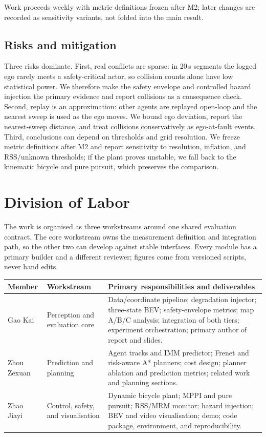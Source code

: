 \documentclass[10pt,a4paper]{article}
\renewcommand{\arraystretch}{1.0}
\begin{document}
Work proceeds weekly with metric definitions frozen after M2; later changes are recorded as sensitivity variants, not folded into the main result.

\newpage
\subsection{Risks and mitigation}

Three risks dominate. First, real conflicts are sparse: in 20\,s segments the logged ego rarely meets a safety-critical actor, so collision counts alone have low statistical power. We therefore make the safety envelope and controlled hazard injection the primary evidence and report collisions as a consequence check. Second, replay is an approximation: other agents are replayed open-loop and the nearest sweep is used as the ego moves. We bound ego deviation, report the nearest-sweep distance, and treat collisions conservatively as ego-at-fault events. Third, conclusions can depend on thresholds and grid resolution. We freeze metric definitions after M2 and report sensitivity to resolution, inflation, and RSS/unknown thresholds; if the plant proves unstable, we fall back to the kinematic bicycle and pure pursuit, which preserves the comparison.

\section{Division of Labor}

The work is organised as three workstreams around one shared evaluation contract. The core workstream owns the measurement definition and integration path, so the other two can develop against stable interfaces. Every module has a primary builder and a different reviewer; figures come from versioned scripts, never hand edits.

\begin{center}
\footnotesize
\renewcommand{\arraystretch}{1.06}
\label{tab:labor}\par\vspace{2pt}
\begin{tabularx}{\linewidth}{@{}l l X@{}}
\toprule
\textbf{Member} & \textbf{Workstream} & \textbf{Primary responsibilities and deliverables}\\
\midrule
Gao Kai & Perception and evaluation core &
Data/coordinate pipeline; degradation injector; three-state BEV; safety-envelope metrics; map A/B/C analysis; integration of both tiers; experiment orchestration; primary author of report and slides.\\
Zhou Zexuan & Prediction and planning &
Agent tracks and IMM predictor; Frenet and risk-aware A* planners; cost design; planner ablation and prediction metrics; related work and planning sections.\\
Zhao Jiayi & Control, safety, and visualisation &
Dynamic bicycle plant; MPPI and pure pursuit; RSS/MRM monitor; hazard injection; BEV and video visualisation; demo; code package, environment, and reproducibility.\\
\bottomrule
\end{tabularx}
\end{center}
\end{document}
